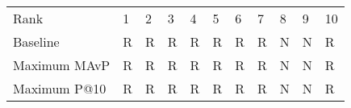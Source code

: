 \begin{tabular}{lllllllllll}
Rank & 1 & 2 & 3 & 4 & 5 & 6 & 7 & 8 & 9 & 10 \\
Baseline & R & R & R & R & R & R & R & N & N & R \\
Maximum MAvP & R & R & R & R & R & R & R & N & N & R \\
Maximum P@10 & R & R & R & R & R & R & R & N & N & R \\
\end{tabular}
